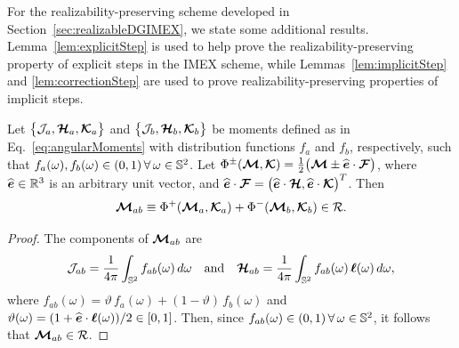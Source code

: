 For the realizability-preserving scheme developed in Section~\ref{sec:realizableDGIMEX}, we state some additional results.  
Lemma~\ref{lem:explicitStep} is used to help prove the realizability-preserving property of explicit steps in the IMEX scheme, while Lemmas~\ref{lem:implicitStep} and \ref{lem:correctionStep} are used to prove realizability-preserving properties of implicit steps.  
\begin{lemma}
  Let $\big\{\mathcal{J}_{a},\boldsymbol{\mathcal{H}}_{a},\boldsymbol{\mathcal{K}}_{a}\big\}$ and $\big\{\mathcal{J}_{b},\boldsymbol{\mathcal{H}}_{b},\boldsymbol{\mathcal{K}}_{b}\big\}$ be moments defined as in Eq.~\eqref{eq:angularMoments} with distribution functions $f_{a}$ and $f_{b}$, respectively, such that $f_{a}(\omega),f_{b}(\omega)\in(0,1)\,\forall\,\omega\in\mathbb{S}^{2}$.  
  Let $\Phi^{\pm}(\boldsymbol{\mathcal{M}},\boldsymbol{\mathcal{K}})=\frac{1}{2}\big(\boldsymbol{\mathcal{M}}\pm\widehat{\boldsymbol{e}}\cdot\boldsymbol{\mathcal{F}}\big)$, where $\widehat{\boldsymbol{e}}\in\mathbb{R}^{3}$ is an arbitrary unit vector, and $\widehat{\boldsymbol{e}}\cdot\boldsymbol{\mathcal{F}}=\big(\widehat{\boldsymbol{e}}\cdot\boldsymbol{\mathcal{H}},\widehat{\boldsymbol{e}}\cdot\boldsymbol{\mathcal{K}}\big)^{T}$.  
  Then
  \begin{equation*}
    \boldsymbol{\mathcal{M}}_{ab} \equiv \Phi^{+}(\boldsymbol{\mathcal{M}}_{a},\boldsymbol{\mathcal{K}}_{a})+\Phi^{-}(\boldsymbol{\mathcal{M}}_{b},\boldsymbol{\mathcal{K}}_{b})\in\mathcal{R}.
  \end{equation*}
  \label{lem:explicitStep}
\end{lemma}
\begin{proof}
  The components of $\boldsymbol{\mathcal{M}}_{ab}$ are
  \begin{equation*}
    \mathcal{J}_{ab}=\frac{1}{4\pi}\int_{\mathbb{S}^{2}}f_{ab}(\omega)\,d\omega
    \quad\text{and}\quad
    \boldsymbol{\mathcal{H}}_{ab}=\frac{1}{4\pi}\int_{\mathbb{S}^{2}}f_{ab}(\omega)\,\boldsymbol{\ell}(\omega)\,d\omega,
  \end{equation*}
  where $f_{ab}(\omega)=\vartheta\,f_{a}(\omega)+(1-\vartheta)\,f_{b}(\omega)$ and $\vartheta(\omega)=(1+\widehat{\boldsymbol{e}}\cdot\boldsymbol{\ell}(\omega))/2\in[0,1]$.  
  Then, since $f_{ab}(\omega)\in(0,1)\,\forall\,\omega\in\mathbb{S}^{2}$, it follows that $\boldsymbol{\mathcal{M}}_{ab}\in\mathcal{R}$.  
\end{proof}

